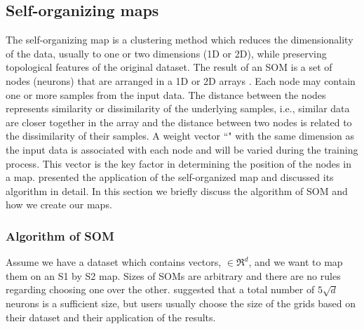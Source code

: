  \subsection{Self-organizing maps}
 \label{sec: som}
 
 The self-organizing map is a clustering method which reduces the dimensionality of the data, usually to one or two dimensions (1D or 2D), while preserving topological features of the original dataset.
 The result of an SOM is a set of nodes (neurons) that are arranged in a 1D or 2D arrays \citep{Kohonen98}. 
 Each node may contain one or more samples from the input data.
 The distance between the nodes represents similarity or dissimilarity of the underlying samples, i.e., similar data are closer together in the array and the distance between two nodes is related to the dissimilarity of their samples.
 A weight vector ``" with the same dimension as the input data is associated with each node and will be varied during the training process.
 This vector is the key factor in determining the position of the nodes in a map.
 \cite{Geach12} presented the application of the self-organized map and discussed its algorithm in detail.
 In this section we briefly discuss the algorithm of SOM and how we create our maps. 
 
 \subsubsection{Algorithm of SOM} 
 \label{sec: algorithm}
     Assume we have a dataset which contains vectors,  $\in \Re^d$, and we want to map them on an S1 by S2 map. 
     Sizes of SOMs are arbitrary and there are no rules regarding choosing one over the other. 
    \citet{Vesanto05} suggested that a total number of $5\sqrt{d}$ neurons is a sufficient size, but users usually choose the size of the grids based on their dataset and their application of the results.

